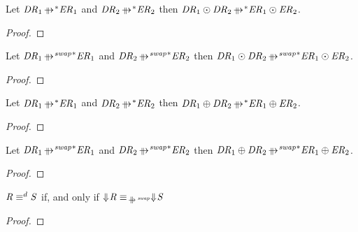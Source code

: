 \documentclass[numbers]{sigplanconf}
\begin{document}
\begin{lemma}
  \label{lem:parallel-rewrite-concatenation}
  Let $\DNFRegex_1 \StarOf{\ParallelRewrite} \DNFRegexAlt_1$ and $\DNFRegex_2
  \StarOf{\ParallelRewrite} \DNFRegexAlt_2$ then
  $\DNFRegex_1 \ConcatDNF \DNFRegex_2 \StarOf{\ParallelRewrite}
  \DNFRegexAlt_1 \ConcatDNF \DNFRegexAlt_2$.
\end{lemma}
\begin{proof}
\end{proof}

\begin{lemma}
  \label{lem:parallel-rewrite-swap-concatenation}
  Let $\DNFRegex_1 \StarOf{\ParallelRewriteSwap} \DNFRegexAlt_1$ and $\DNFRegex_2
  \StarOf{\ParallelRewriteSwap} \DNFRegexAlt_2$ then
  $\DNFRegex_1 \ConcatDNF \DNFRegex_2 \StarOf{\ParallelRewriteSwap}
  \DNFRegexAlt_1 \ConcatDNF \DNFRegexAlt_2$.
\end{lemma}
\begin{proof}
\end{proof}

\begin{lemma}
  \label{lem:parallel-rewrite-or}
  Let $\DNFRegex_1 \StarOf{\ParallelRewrite} \DNFRegexAlt_1$ and $\DNFRegex_2
  \StarOf{\ParallelRewrite} \DNFRegexAlt_2$ then
  $\DNFRegex_1 \OrDNF \DNFRegex_2 \StarOf{\ParallelRewrite}
  \DNFRegexAlt_1 \OrDNF \DNFRegexAlt_2$.
\end{lemma}
\begin{proof}
\end{proof}

\begin{lemma}
  \label{lem:parallel-rewrite-swap-or}
  Let $\DNFRegex_1 \StarOf{\ParallelRewriteSwap} \DNFRegexAlt_1$ and $\DNFRegex_2
  \StarOf{\ParallelRewriteSwap} \DNFRegexAlt_2$ then
  $\DNFRegex_1 \OrDNF \DNFRegex_2 \StarOf{\ParallelRewriteSwap}
  \DNFRegexAlt_1 \OrDNF \DNFRegexAlt_2$.
\end{lemma}
\begin{proof}
\end{proof}




\begin{lemma}
  \label{lem:defequiv-equiv-parallelswapequiv}
  $\mathit{R} \equiv^d \mathit{S}$ if, and only if $\ToDNFRegexOf{\Regex}
  \EquivalenceOf{\ParallelRewriteSwap} \ToDNFRegexOf{\RegexAlt}$
\end{lemma}
\begin{proof}
\end{proof}
\end{document}
